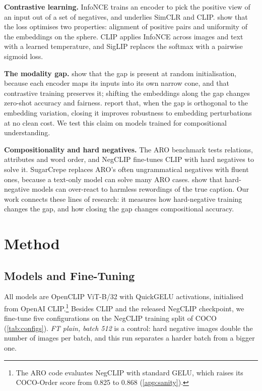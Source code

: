 \documentclass{article}
\begin{document}
\textbf{Contrastive learning.}
InfoNCE \citep{oord2018cpc} trains an encoder to pick the positive view of an input out of a set of negatives, and underlies SimCLR \citep{chen2020simclr} and CLIP. \citet{wang2020alignment} show that the loss optimises two properties: alignment of positive pairs and uniformity of the embeddings on the sphere. CLIP \citep{radford2021clip} applies InfoNCE across images and text with a learned temperature, and SigLIP \citep{zhai2023siglip} replaces the softmax with a pairwise sigmoid loss.

\textbf{The modality gap.}
\citet{liang2022gap} show that the gap is present at random initialisation, because each encoder maps its inputs into its own narrow cone, and that contrastive training preserves it; shifting the embeddings along the gap changes zero-shot accuracy and fairness. \citet{chowers2026bug} report that, when the gap is orthogonal to the embedding variation, closing it improves robustness to embedding perturbations at no clean cost. We test this claim on models trained for compositional understanding.

\textbf{Compositionality and hard negatives.}
The ARO benchmark \citep{yuksekgonul2023bow} tests relations, attributes and word order, and NegCLIP fine-tunes CLIP with hard negatives to solve it. SugarCrepe \citep{hsieh2023sugarcrepe} replaces ARO's often ungrammatical negatives with fluent ones, because a text-only model can solve many ARO cases. \citet{kamath2024hardpositive} show that hard-negative models can over-react to harmless rewordings of the true caption. Our work connects these lines of research: it measures how hard-negative training changes the gap, and how closing the gap changes compositional accuracy.

\section{Method}
\label{sec:method}

\subsection{Models and Fine-Tuning}

All models are OpenCLIP \citep{ilharco2021openclip} ViT-B/32 with QuickGELU activations, initialised from OpenAI CLIP.\footnote{The ARO code evaluates NegCLIP with standard GELU, which raises its COCO-Order score from 0.825 to 0.868 (\cref{app:sanity}).} Besides CLIP and the released NegCLIP checkpoint, we fine-tune five configurations on the NegCLIP training split of COCO \citep{lin2014coco} (\cref{tab:configs}). \emph{FT plain, batch 512} is a control: hard negative images double the number of images per batch, and this run separates a harder batch from a bigger one.
\end{document}
